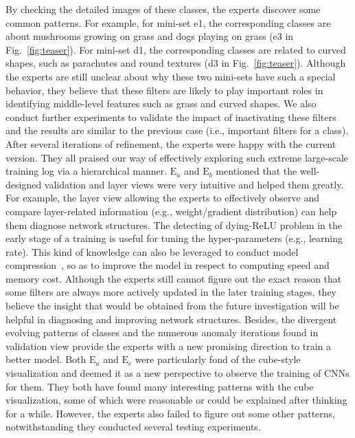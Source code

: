\documentclass[format=acmsmall, review=false, screen=true]{acmart}
\newcommand{\ea}{{$\mathrm{E}_a$}\xspace}
\newcommand{\eb}{{$\mathrm{E}_b$}\xspace}
\newcommand{\ec}{{$\mathrm{E}_c$}\xspace}
\begin{document}
By checking the detailed images of these classes, the experts discover some common patterns.
For example, for mini-set e1, the corresponding classes are about mushrooms growing on grass and dogs playing on grass (e3 in Fig.~\ref{fig:teaser}).
For mini-set d1, the corresponding classes are related to curved shapes, such as parachutes and round textures (d3 in Fig.~\ref{fig:teaser}).
Although the experts are still unclear about why these two mini-sets have such a special behavior, they believe that these filters are likely to play important roles in identifying middle-level features such as grass and curved shapes.
We also conduct further experiments to validate the impact of inactivating these filters and the results are similar to the previous case (i.e., important filters for a class).
After several iterations of refinement, the experts were happy with the current version. They all praised our way of effectively exploring such extreme large-scale training log via a hierarchical manner.
\ea and \eb mentioned that the well-designed validation and layer views were very intuitive and helped them greatly. For example, the layer view allowing the experts to effectively observe and compare layer-related information (e.g., weight/gradient distribution) can help them diagnose network structures. The detecting of dying-ReLU problem in the early stage of a training is useful for tuning the hyper-parameters (e.g., learning rate). This kind of knowledge can also be leveraged to conduct model compression~\cite{han2015deep}, so as to improve the model in respect to computing speed and memory cost. Although the experts still cannot figure out the exact reason that some filters are always more actively updated in the later training stages, they believe the insight that would be obtained from the future investigation will be helpful in diagnosing and improving network structures. Besides, the divergent evolving patterns of classes and the numerous anomaly iterations found in validation view provide the experts with a new promising direction to train a better model.
Both \ea and \ec were particularly fond of the cube-style visualization and deemed it as a new perspective to observe the training of CNNs for them.
They both have found many interesting patterns with the cube visualization, some of which were reasonable or could be explained after thinking for a while.
However, the experts also failed to figure out some other patterns, notwithstanding they conducted several testing experiments.
\end{document}
